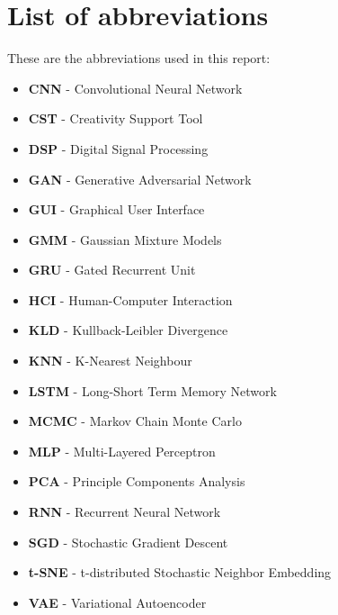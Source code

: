 \chapter*{List of abbreviations}

These are the abbreviations used in this report: 
\begin{itemize}
\item \textbf{CNN} - Convolutional Neural Network
\item \textbf{CST} - Creativity Support Tool
\item \textbf{DSP} - Digital Signal Processing
\item \textbf{GAN} - Generative Adversarial Network
\item \textbf{GUI} - Graphical User Interface
\item \textbf{GMM} - Gaussian Mixture Models
\item \textbf{GRU} - Gated Recurrent Unit
\item \textbf{HCI} - Human-Computer Interaction
\item \textbf{KLD} - Kullback-Leibler Divergence
\item \textbf{KNN} - K-Nearest Neighbour
\item \textbf{LSTM} - Long-Short Term Memory Network
\item \textbf{MCMC} - Markov Chain Monte Carlo
\item \textbf{MLP} - Multi-Layered Perceptron
\item \textbf{PCA} - Principle Components Analysis
\item \textbf{RNN} - Recurrent Neural Network
\item \textbf{SGD} - Stochastic Gradient Descent
\item \textbf{t-SNE} - t-distributed Stochastic Neighbor Embedding
\item \textbf{VAE} - Variational Autoencoder
\end{itemize}